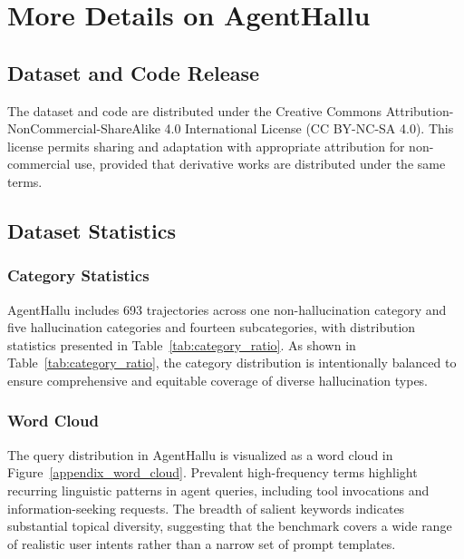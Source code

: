 


\section{More Details on AgentHallu}
\subsection{Dataset and Code Release}
\label{appendix_data_code_realease}
The dataset and code are distributed under the Creative Commons Attribution-NonCommercial-ShareAlike 4.0 International License (CC BY-NC-SA 4.0). This license permits sharing and adaptation with appropriate attribution for non-commercial use, provided that derivative works are distributed under the same terms.

\subsection{Dataset Statistics}
\label{appendix_data_statis}

\subsubsection{Category Statistics}
AgentHallu includes 693 trajectories across one non-hallucination category and five hallucination categories and fourteen subcategories, with distribution statistics presented in Table~\ref{tab:category_ratio}. As shown in Table~\ref{tab:category_ratio}, the category distribution is intentionally balanced to ensure comprehensive and equitable coverage of diverse hallucination types. 



\subsubsection{Word Cloud}
The query distribution in AgentHallu is visualized as a word cloud in Figure~\ref{appendix_word_cloud}. Prevalent high-frequency terms highlight recurring linguistic patterns in agent queries, including tool invocations and information-seeking requests. The breadth of salient keywords indicates substantial topical diversity, suggesting that the benchmark covers a wide range of realistic user intents rather than a narrow set of prompt templates.

